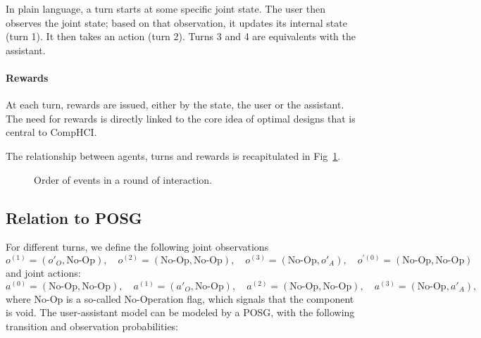 \documentclass[12pt,a4paper]{article}
\begin{document}
In plain language, a turn starts at some specific joint state. The user then observes the joint state; based on that observation, it updates its internal state (turn 1). It then takes an action (turn 2). Turns 3 and 4 are equivalents with the assistant. 


\paragraph{Rewards} At each turn, rewards are issued, either by the state, the user or the assistant. The need for rewards is directly linked to the core idea of optimal designs that is central to CompHCI.


The relationship between agents, turns and rewards is recapitulated in Fig~\ref{fig:sequence_events}.

\begin{figure}
\centering
{}
\caption{Order of events in a round of interaction. \label{fig:sequence_events}}
\end{figure}


\subsection{Relation to POSG}
For different turns, we define the following joint observations
$$ o^{(1)} = (o'_O, \text{No-Op}), \quad o^{(2)} = (\text{No-Op}, \text{No-Op}), \quad o^{(3)} = (\text{No-Op}, o'_A), \quad o^{'(0)} = (\text{No-Op}, \text{No-Op})$$
and joint actions:
$$a^{(0)} = (\text{No-Op}, \text{No-Op}),\quad a^{(1)} = (a'_O, \text{No-Op}),\quad a^{(2)} = (\text{No-Op}, \text{No-Op}),\quad a^{(3)} = (\text{No-Op}, a'_A),$$
where No-Op is a so-called No-Operation flag, which signals that the component is void.
The user-assistant model can be modeled by a POSG, with the following transition and observation probabilities:
\end{document}
